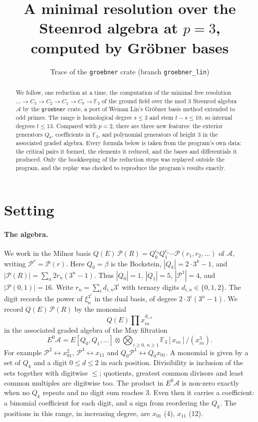 \documentclass[11pt]{article}
\title{A minimal resolution over the Steenrod algebra at $p = 3$,\\ computed by Gröbner bases}
\author{Trace of the \texttt{groebner} crate (branch \texttt{groebner\_lin})}
\date{}
\renewcommand{\P}{\mathcal{P}}
\newcommand{\F}{\mathbb{F}_3}
\newcommand{\A}{\mathcal{A}}
\begin{document}
\maketitle

\begin{abstract}
We follow, one reduction at a time, the computation of the minimal free resolution
$\dots \to C_3 \to C_2 \to C_1 \to C_0 \to \F$ of the ground field over the mod $3$ Steenrod
algebra $\A$ by the \texttt{groebner} crate, a port of Weinan Lin's Gröbner basis method
extended to odd primes. The range is homological degree $s \le 3$ and stem $t - s \le 10$, so
internal degrees $t \le 13$. Compared with $p = 2$, there are three new features: the exterior
generators $Q_k$, coefficients in $\F$, and polynomial generators of height $3$ in the
associated graded algebra. Every formula below is taken from the program's own data: the
critical pairs it formed, the elements it reduced, and the bases and differentials it
produced. Only the bookkeeping of the reduction steps was replayed outside the program, and the
replay was checked to reproduce the program's results exactly.
\end{abstract}

\section{Setting}

\paragraph{The algebra.}
We work in the Milnor basis $Q(E)\,\P(R) = Q_0^{\epsilon_0}Q_1^{\epsilon_1}\cdots
\P(r_1, r_2, \dots)$ of $\A$, writing $\P^r = \P(r)$. Here $Q_0 = \beta$ is the Bockstein,
$|Q_k| = 2\cdot 3^k - 1$, and $|\P(R)| = \sum_n 2 r_n (3^n - 1)$. Thus $|Q_0| = 1$, $|Q_1| = 5$,
$|\P^1| = 4$, and $|\P(0,1)| = 16$. Write $r_n = \sum_i d_{i,n} 3^i$ with ternary digits
$d_{i,n} \in \{0, 1, 2\}$. The digit records the power of $\xi_n^{3^i}$ in the dual basis,
of degree $2\cdot 3^i(3^n - 1)$. We record $Q(E)\,\P(R)$ by the monomial
\[ Q(E) \prod x_{in}^{d_{i,n}} \]
in the associated graded algebra of the May filtration
\[ E^0\A = E[Q_0, Q_1, \dots] \otimes \bigotimes_{i \ge 0,\, n \ge 1} \F[x_{in}]/(x_{in}^3). \]
For example $\P^2 \leftrightarrow x_{01}^2$, $\P^3 \leftrightarrow x_{11}$ and
$Q_0\P^1 \leftrightarrow Q_0x_{01}$. A monomial is given by a set of $Q_k$ and a digit
$0 \le d \le 2$ in each position. Divisibility is inclusion of the sets together with digitwise
$\le$; quotients, greatest common divisors and least common multiples are digitwise too. The
product in $E^0\A$ is non-zero exactly when no $Q_k$ repeats and no digit sum reaches $3$. Even
then it carries a coefficient: a binomial coefficient for each digit, and a sign from
reordering the $Q_k$. The positions in this range, in increasing degree, are $x_{01}$ (4), $x_{11}$ (12).
\end{document}
